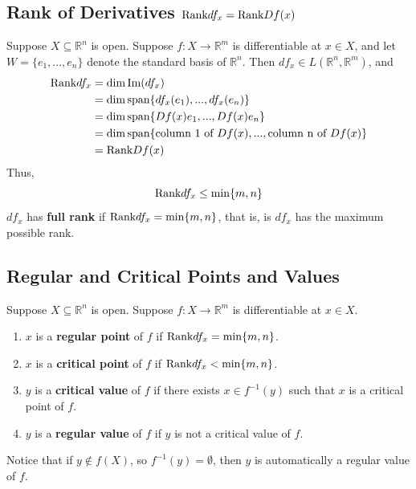 \documentclass[11pt]{elegantbook}
\begin{document}
\subsection{Rank of Derivatives $\textnormal{Rank} df_x=\textnormal{Rank} Df(x)$}
Suppose $X \subseteq \mathbb{R}^n$ is open. Suppose $f : X \rightarrow \mathbb{R}^m$ is differentiable at $x \in X$, and let $W = \{e_1, . . . , e_n\}$ denote the standard basis of $\mathbb{R}^n$. Then $df_x \in L(\mathbb{R}^n, \mathbb{R}^m)$, and
\begin{equation}
    \begin{aligned}
        \textnormal{Rank} df_x &= \dim \textnormal{Im}(df_x)\\
        &= \dim \textnormal{span}\{df_x(e_1), . . . , df_x(e_n)\}\\
        &= \dim \textnormal{span}\{Df(x)e_1, . . . , Df(x)e_n\}\\
        &= \dim \textnormal{span}\{\textnormal{column 1 of }Df(x), . . . , \textnormal{column n of }Df(x)\}\\
        &=\textnormal{Rank} Df(x)
    \end{aligned}
    \nonumber
\end{equation}
Thus,
$$\textnormal{Rank} df_x\leq\min\{m,n\}$$
$df_x$ has \textbf{full rank} if $\textnormal{Rank} df_x=\min\{m,n\}$, that is, is $df_x$ has the maximum possible rank.

\subsection{Regular and Critical Points and Values}
\begin{definition}
    \normalfont
    Suppose $X \subseteq \mathbb{R}^n$ is open. Suppose $f : X \rightarrow \mathbb{R}^m$ is differentiable at $x \in X$.
    \begin{enumerate}
        \item $x$ is a \textbf{regular point} of $f$ if $\textnormal{Rank} df_x=\min\{m,n\}$.
        \item $x$ is a \textbf{critical point} of $f$ if $\textnormal{Rank} df_x<\min\{m,n\}$.
        \item $y$ is a \textbf{critical value} of $f$ if  there exists $x \in f^{-1}(y)$ such that $x$ is a critical point of $f$.
        \item $y$ is a \textbf{regular value} of $f$ if $y$ is not a critical value of $f$.
    \end{enumerate}
\end{definition}
\begin{note}
    Notice that if $y \notin f(X)$, so $f^{-1}(y) = \emptyset$, then $y$ is automatically a regular value of $f$.
\end{note}
\end{document}
